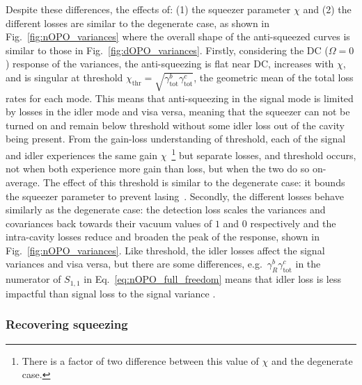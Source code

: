 Despite these differences, the effects of: (1) the squeezer parameter $\chi$ and (2) the different losses are similar to the degenerate case, as shown in Fig.~\ref{fig:nOPO_variances} where the overall shape of the anti-squeezed curves is similar to those in Fig.~\ref{fig:dOPO_variances}. 
Firstly, considering the DC ($\Omega=0$) response of the variances, the anti-squeezing is flat near DC, increases with $\chi$, and is singular at threshold $\chi_\text{thr}=\sqrt{\gamma^b_\text{tot}\gamma^c_\text{tot}}$, the geometric mean of the total loss rates for each mode. This means that anti-squeezing in the signal mode is limited by losses in the idler mode and visa versa, meaning that the squeezer can not be turned on and remain below threshold without some idler loss out of the cavity being present. %
From the gain-loss understanding of threshold, each of the signal and idler experiences the same gain $\chi$~\footnote{There is a factor of two difference between this value of $\chi$ and the degenerate case.} but separate losses, and threshold occurs, not when both experience more gain than loss, but when the two do so on-average.  The effect of this threshold is similar to the degenerate case: it bounds the squeezer parameter to prevent lasing~\cite{}. 
Secondly, the different losses behave similarly as the degenerate case: the detection loss scales the variances and covariances back towards their vacuum values of $1$ and $0$ respectively and the intra-cavity losses reduce and broaden the peak of the response, shown in Fig.~\ref{fig:nOPO_variances}. Like threshold, the idler losses affect the signal variances and visa versa, but there are some differences, e.g.\ $\gamma^b_R {\gamma^c_\text{tot}}$ in the numerator of $S_{1,1}$ in Eq.~\ref{eq:nOPO_full_freedom} means that idler loss is less impactful than signal loss to the signal variance . 


\subsubsection{Recovering squeezing}

